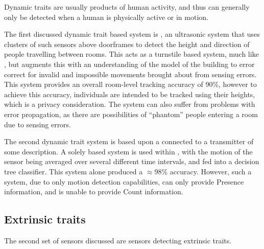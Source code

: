 \documentclass[../thesis/thesis.tex]{subfiles}
\begin{document}
Dynamic traits are usually products of human activity, and thus can generally only be detected when a human is physically active or in motion.

The first discussed dynamic trait based system is \cite{hnat2012doorjamb}, an ultrasonic system that uses clusters of such sensors above doorframes to detect the height and direction of people travelling between rooms. This acts as a turnstile based system, much like \cite{erickson2013poem}, but augments this with an understanding of the model of the building to error correct for invalid and impossible movements brought about from sensing errors. This system provides an overall room-level tracking accuracy of 90\%, however to achieve this accuracy, individuals are intended to be tracked using their heights, which is a privacy consideration. The system can also suffer from problems with error propagation, as there are possibilities of ``phantom'' people entering a room due to sensing errors.

The second dynamic trait system is based upon a \pir connected to a transmitter of some description. A solely \pir based system is used within \cite{hailemariam2011real}, with the motion of the sensor being averaged over several different time intervals, and fed into a decision tree classifier. This \pir system alone produced a $\approx98\%$ accuracy. However, such a system, due to only motion detection capabilities, can only provide Presence information, and is unable to provide Count information.

\subsection{Extrinsic traits}
\label{subsec:litreview:sensors:extrinsic}
The second set of sensors discussed are sensors detecting extrinsic traits.
\end{document}
